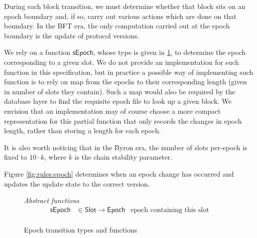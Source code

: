 \documentclass[11pt,a4paper]{article}
\newcommand{\fun}[1]{\mathsf{#1}}
\newcommand{\type}[1]{\mathsf{#1}}
\newcommand{\totalf}{\to}
\newcommand{\Slot}{\type{Slot}}
\begin{document}
\newcommand{\Epoch}{\type{Epoch}}

\newcommand{\ETState}{\type{ETState}}
\newcommand{\ETEnv}{\type{ETEnv}}

\newcommand{\sepochname}{sEpoch}
\newcommand{\sepoch}[1]{\fun{\sepochname}\ #1}

During each block transition, we must determine whether that block sits on an
epoch boundary and, if so, carry out various actions which are done on that
boundary. In the BFT era, the only computation carried out at the epoch boundary
is the update of protocol versions.

We rely on a function $\fun{\sepochname}$, whose type is given in
\cref{fig:defs:epoch}, to determine the epoch corresponding to a given slot.
%
We do not provide an implementation for such function in this specification,
but in practice a possible way of implementing such function is to rely on map
from the epochs to their corresponding length (given in number of slots they
contain). Such a map would also be required by the database layer to find the
requisite epoch file to look up a given block. We envision that an
implementation may of course choose a more compact representation for this
partial function that only records the changes in epoch length, rather than
storing a length for each epoch.

It is also worth noticing that in the Byron era, the number of slots per-epoch
is fixed to $10 \cdot k$, where $k$ is the chain stability parameter.

Figure \ref{fig:rules:epoch} determines when an epoch change has occurred and
updates the update state to the correct version.

\begin{figure}[ht]
  \emph{Abstract functions}
  \begin{equation*}
    \begin{array}{rlr}
      \fun{\sepochname}
      & \in \Slot \totalf \Epoch
      & \text{epoch containing this slot} \\
    \end{array}
  \end{equation*}

  \caption{Epoch transition types and functions}
  \label{fig:defs:epoch}
\end{figure}
\end{document}
